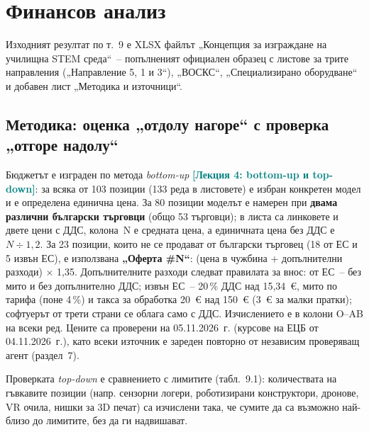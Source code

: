 \documentclass[11pt,a4paper]{article}
\newcommand{\lecturetag}[1]{\textcolor{teal}{\small\bfseries[#1]}}
\newcommand{\NumItems}{103}
\newcommand{\NumLines}{133}
\newcommand{\NumBGItems}{80}
\newcommand{\NumOffers}{23}
\newcommand{\NumSellers}{53}
\newcommand{\NumOffersEU}{18}
\newcommand{\NumOffersNonEU}{5}
\begin{document}
\section{Финансов анализ}

Изходният резултат по т.~9 е XLSX файлът „Концепция за изграждане на училищна STEM среда“~– попълненият официален образец с листове за трите направления („Направление 5, 1 и 3“), „ВОСКС“, „Специализирано оборудване“ и добавен лист „Методика и източници“.

\subsection{Методика: оценка „отдолу нагоре“ с проверка „отгоре надолу“}
Бюджетът е изграден по метода \emph{bottom-up} \lecturetag{Лекция 4: bottom-up и top-down}: за всяка от \NumItems{} позиции (\NumLines{} реда в листовете) е избран конкретен модел и е определена единична цена. За \NumBGItems{} позиции моделът е намерен при \textbf{двама различни български търговци} (общо \NumSellers{} търговци); в листа са линковете и двете цени с ДДС, колона~N е средната цена, а единичната цена без ДДС е $N \div 1{,}2$. За \NumOffers{} позиции, които не се продават от български търговец (\NumOffersEU{} от ЕС и \NumOffersNonEU{} извън ЕС), е използвана \textbf{„Оферта \#N“}: (цена в чужбина + допълнителни разходи) $\times$ 1,35. Допълнителните разходи следват правилата за внос: от ЕС~– без мито и без допълнително ДДС; извън ЕС~– 20\,\% ДДС над 15,34~€, мито по тарифа (поне 4\,\%) и такса за обработка 20~€ над 150~€ (3~€ за малки пратки); софтуерът от трети страни се облага само с ДДС. Изчислението е в колони O–AB на всеки ред. Цените са проверени на 05.11.2026~г. (курсове на ЕЦБ от 04.11.2026~г.), като всеки източник е зареден повторно от независим проверяващ агент (раздел~7).

Проверката \emph{top-down} е сравнението с лимитите (табл.~9.1): количествата на гъвкавите позиции (напр. сензорни логери, роботизирани конструктори, дронове, VR очила, нишки за 3D печат) са изчислени така, че сумите да са възможно най-близо до лимитите, без да ги надвишават.
\end{document}
